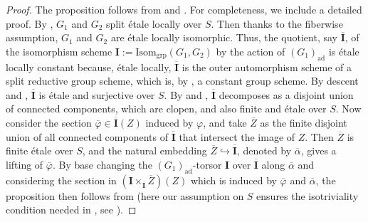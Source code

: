 \documentclass[11pt, reqno]{amsart}
\theoremstyle{plain}
\theoremstyle{definition}
\begin{document}
\begin{proof}
    The proposition follows from  and \cite[Proposition~6.2.5]{CKproblemtorsors}. For completeness, we include a detailed proof. By \cite[exposé~XXII, corollaire~2.3]{SGA3III}, $G_1$ and $G_2$ split étale locally over $S$. Then thanks to the fiberwise assumption, $G_1$ and $G_2$ are étale locally isomorphic.  
    Thus, the quotient, say $\overline{\mathbf{I}}$, of the isomorphism scheme $\mathbf{I}:=\text{Isom}_{\text{grp}}(G_1, G_2)$ by the action of $(G_1)_{\text{ad}}$ is étale locally constant because, étale locally, $\overline{\mathbf{I}}$ is the outer automorphism scheme of a split reductive group scheme, which is, by \cite[exposé~XXIV, théorème~1.3~(iii)]{SGA3III}, a constant group scheme. 
    By descent \cite[proposition~2.6.1 (i)]{EGAIV2} and \cite[corollaire~17.7.3 (ii)]{EGAIV4}, $\overline{\mathbf{I}}$ is étale and surjective over $S$. By \cite[exposé~X, corollaire 5.14]{SGA3II} and \cite[corollaire~6.1.9]{EGA1}, $\overline{\mathbf{I}}$ decomposes as a disjoint union of connected components, which are clopen, and also finite and étale over $S$. Now consider the section $\overline{\varphi}\in\overline{\mathbf{I}}(Z)$ induced by $\varphi$, and take $\overline{Z}$ as the finite disjoint union of all connected components of $\overline{\mathbf{I}}$ that intersect the image of $Z$. Then $\overline{Z}$ is finite étale over $S$, and the natural embedding $\overline{Z}\hookrightarrow \overline{\mathbf{I}}$, denoted by $\overline{\alpha}$, gives a lifting of $\overline{\varphi}$. By base changing the $(G_1)_{\text{ad}}$-torsor $\mathbf{I}$ over $\overline{\mathbf{I}}$ along $\overline{\alpha}$ and considering the section in $(\mathbf{I}\times_{\overline{\mathbf{I}}}\overline{Z})(Z)$ which is induced by $\overline{\varphi}$ and $\overline{\alpha}$, the proposition then follows from  (here our assumption on $S$ ensures the isotriviality condition needed in , see \cite[exposé~XXIV, théoreme~4.1.5, corollaire~4.1.6]{SGA3III}).
\end{proof}  
\end{document}
